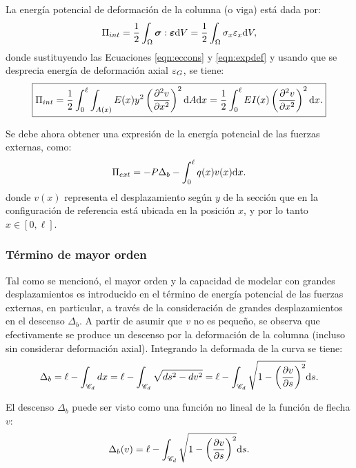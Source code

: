 La energía potencial de deformación de la columna (o viga) está dada por:
%
\begin{equation}
\Pi_{int} = \frac{1}{2} \int_\Omega \boldsymbol{\sigma} : \boldsymbol{\varepsilon}  {\text{d}} V  = \frac{1}{2} \int_\Omega \sigma_x \varepsilon_x  {\text{d}} V,
\end{equation}
%
donde sustituyendo las Ecuaciones \eqref{eqn:eccons} y \eqref{eqn:expdef} y usando que se desprecia energía de deformación axial $\varepsilon_G$, se tiene:
%
\begin{equation}
\boxed{
\Pi_{int} = \frac{1}{2} \int_0^\ell \int_{A(x)} E(x) y^2 \left( \frac{\partial^2 v}{\partial x^2}\right)^2  {\text{d}} A {\text{d}} x 
=   \frac{1}{2} \int_0^\ell EI(x)  \left( \frac{\partial^2 v}{\partial x^2}\right)^2 {\text{d}} x.
}
\end{equation}

Se debe ahora obtener una expresión de la energía potencial de las fuerzas externas, como:
\begin{equation}
\Pi_{ext} = -P \Delta_b  - \int_0^\ell q(x) v(x) {\text{d}} x.
\end{equation}
%
donde $v(x)$ representa el desplazamiento según $y$ de la sección que en la configuración de referencia está ubicada en la posición $x$, y por lo tanto $x\in[0,\ell]$.



\subsubsection{Término de mayor orden}

Tal como se mencionó, el mayor orden y la capacidad de modelar con grandes desplazamientos es introducido en el término de energía potencial de las fuerzas externas, en particular, a través de la consideración de grandes desplazamientos en el descenso $\Delta_b$. %
%
A partir de asumir que $v$ no es pequeño, se observa que efectivamente se produce un descenso por la deformación de la columna (incluso sin considerar deformación axial). Integrando la deformada de la curva se tiene:
%
\begin{equation}
\Delta_b = \ell - \int_{\mathscr{C}_d} dx = \ell - \int_{\mathscr{C}_d} \sqrt{ds^2-dv^2} = \ell - 
\int_{\mathscr{C}_d} \sqrt{1-\left(\frac{\partial v}{\partial s}\right)^2} {\text{d}} s.
\end{equation}

El descenso $\Delta_b$ puede ser visto como una función no lineal de la función de flecha $v$:
%
$$
\Delta_b(v) = \ell - 
\int_{\mathscr{C}_d} \sqrt{1-\left(\frac{\partial v}{\partial s}\right)^2} {\text{d}} s.
$$

